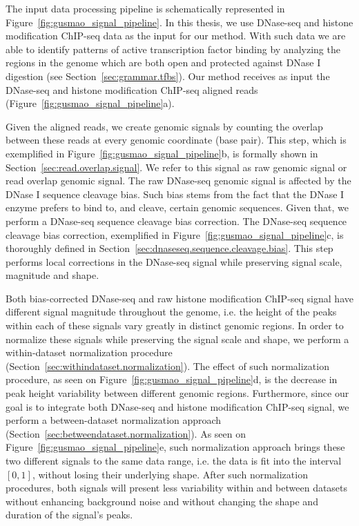 The input data processing pipeline is schematically represented in Figure~\ref{fig:gusmao_signal_pipeline}. In this thesis, we use DNase-seq and histone modification ChIP-seq data as the input for our method. With such data we are able to identify patterns of active transcription factor binding by analyzing the regions in the genome which are both open and protected against DNase I digestion (see Section~\ref{sec:grammar.tfbs}). Our method receives as input the DNase-seq and histone modification ChIP-seq aligned reads (Figure~\ref{fig:gusmao_signal_pipeline}a).

Given the aligned reads, we create genomic signals by counting the overlap between these reads at every genomic coordinate (base pair). This step, which is exemplified in Figure~\ref{fig:gusmao_signal_pipeline}b, is formally shown in Section~\ref{sec:read.overlap.signal}. We refer to this signal as raw genomic signal or read overlap genomic signal. The raw DNase-seq genomic signal is affected by the DNase I sequence cleavage bias. Such bias stems from the fact that the DNase I enzyme prefers to bind to, and cleave, certain genomic sequences. Given that, we perform a DNase-seq sequence cleavage bias correction. The DNase-seq sequence cleavage bias correction, exemplified in Figure~\ref{fig:gusmao_signal_pipeline}c, is thoroughly defined in Section~\ref{sec:dnaseseq.sequence.cleavage.bias}. This step performs local corrections in the DNase-seq signal while preserving signal scale, magnitude and shape.

Both bias-corrected DNase-seq and raw histone modification ChIP-seq signal have different signal magnitude throughout the genome, i.e. the height of the peaks within each of these signals vary greatly in distinct genomic regions. In order to normalize these signals while preserving the signal scale and shape, we perform a within-dataset normalization procedure (Section~\ref{sec:withindataset.normalization}). The effect of such normalization procedure, as seen on Figure~\ref{fig:gusmao_signal_pipeline}d, is the decrease in peak height variability between different genomic regions. Furthermore, since our goal is to integrate both DNase-seq and histone modification ChIP-seq signal, we perform a between-dataset normalization approach (Section~\ref{sec:betweendataset.normalization}). As seen on Figure~\ref{fig:gusmao_signal_pipeline}e, such normalization approach brings these two different signals to the same data range, i.e. the data is fit into the interval $[0,1]$, without losing their underlying shape. After such normalization procedures, both signals will present less variability within and between datasets without enhancing background noise and without changing the shape and duration of the signal's peaks.

